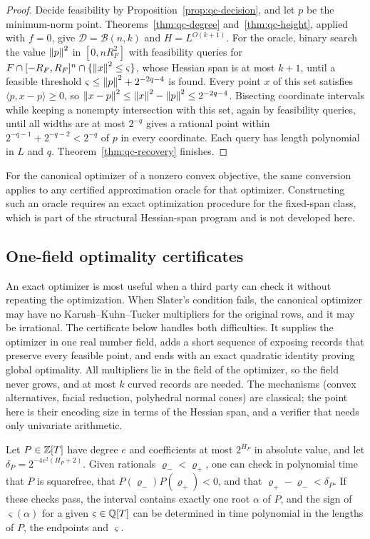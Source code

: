 \begin{proof}
Decide feasibility by Proposition~\ref{prop:qc-decision}, and let $p$ be the
minimum-norm point. Theorems~\ref{thm:qc-degree} and~\ref{thm:qc-height},
applied with $f=0$, give $\mathcal D=\mathcal B(n,k)$ and $H=L^{O(k+1)}$.
For the oracle, binary search the value $\left\lVert p\right\rVert^2$ in $[0,nR_F^2]$ with
feasibility queries for $F\cap[-R_F,R_F]^n\cap\{\left\lVert x\right\rVert^2\le\varsigma\}$,
whose Hessian span is at most $k+1$, until a feasible threshold
$\varsigma\le\left\lVert p\right\rVert^2+2^{-2q-4}$ is found. Every point $x$ of this set satisfies
$\langle p,x-p\rangle\ge0$, so $\left\lVert x-p\right\rVert^2\le\left\lVert x\right\rVert^2-\left\lVert p\right\rVert^2\le
2^{-2q-4}$. Bisecting coordinate intervals while keeping a nonempty
intersection with this set, again by feasibility queries, until all widths
are at most $2^{-q}$ gives a rational point within $2^{-q-1}+2^{-q-2}<2^{-q}$ of
$p$ in every coordinate. Each query has length polynomial in $L$ and $q$.
Theorem~\ref{thm:qc-recovery} finishes.
\end{proof}

For the canonical optimizer of a nonzero convex objective, the same
conversion applies to any certified approximation oracle for that optimizer.
Constructing such an oracle requires an exact optimization procedure for the
fixed-span class, which is part of the structural Hessian-span program and is
not developed here.

\subsection{One-field optimality certificates}
\label{app:qc-certificates}

An exact optimizer is most useful when a third party can check it without
repeating the optimization. When Slater's condition fails, the canonical
optimizer may have no Karush--Kuhn--Tucker multipliers for the original rows,
and it may be irrational. The certificate below handles both difficulties. It
supplies the optimizer in one real number field, adds a short sequence of
exposing records that preserve every feasible point, and ends with an exact
quadratic identity proving global optimality. All multipliers lie in the field
of the optimizer, so the field never grows, and at most $k$ curved records are
needed. The mechanisms (convex alternatives, facial reduction, polyhedral
normal cones) are classical; the point here is their encoding size in terms of
the Hessian span, and a verifier that needs only univariate arithmetic.

\begin{lemma}
\label{lem:qc-sign}
Let $P\in\mathbb Z[T]$ have degree $e$ and coefficients at most $2^{H_P}$ in
absolute value, and let $\delta_P=2^{-4e^2(H_P+2)}$. Given rationals
$\varrho_-<\varrho_+$, one can check in polynomial time that $P$ is
squarefree, that $P(\varrho_-)P(\varrho_+)<0$, and that
$\varrho_+-\varrho_-<\delta_P$. If these checks pass, the interval contains
exactly one root $\alpha$ of $P$, and the sign of $\varsigma(\alpha)$ for a
given $\varsigma\in\mathbb Q[T]$ can be determined in time polynomial in the lengths
of $P$, the endpoints and $\varsigma$.
\end{lemma}

